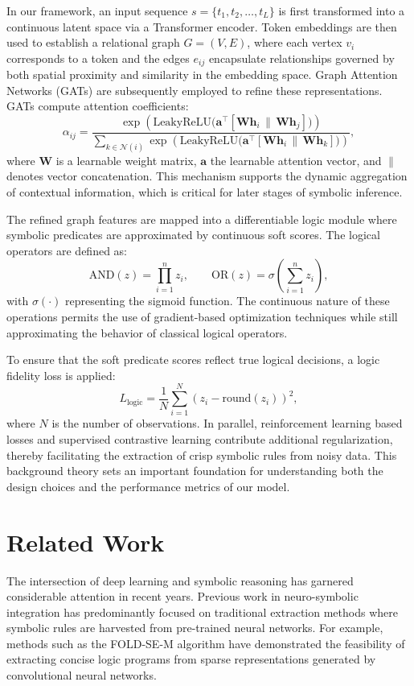 \documentclass{article}
\begin{document}
In our framework, an input sequence \(s=\{t_1,t_2,\dots,t_L\}\) is first transformed into a continuous latent space via a Transformer encoder. Token embeddings are then used to establish a relational graph \(G=(V,E)\), where each vertex \(v_i\) corresponds to a token and the edges \(e_{ij}\) encapsulate relationships governed by both spatial proximity and similarity in the embedding space. Graph Attention Networks (GATs) are subsequently employed to refine these representations. GATs compute attention coefficients:
\[
\alpha_{ij}=\frac{\exp\left(\text{LeakyReLU}\bigl(\mathbf{a}^{\top}[\mathbf{W}\mathbf{h}_{i}\,\|\,\mathbf{W}\mathbf{h}_{j}]\bigr)\right)}{\sum_{k\in\mathcal{N}(i)}\exp\left(\text{LeakyReLU}\bigl(\mathbf{a}^{\top}[\mathbf{W}\mathbf{h}_{i}\,\|\,\mathbf{W}\mathbf{h}_{k}]\bigr)\right)},
\]
where \(\mathbf{W}\) is a learnable weight matrix, \(\mathbf{a}\) the learnable attention vector, and \(\|\) denotes vector concatenation. This mechanism supports the dynamic aggregation of contextual information, which is critical for later stages of symbolic inference.

The refined graph features are mapped into a differentiable logic module where symbolic predicates are approximated by continuous soft scores. The logical operators are defined as:
\[
\text{AND}(z)=\prod_{i=1}^{n}z_i,\qquad \text{OR}(z)=\sigma\left(\sum_{i=1}^{n}z_i\right),
\]
with \(\sigma(\cdot)\) representing the sigmoid function. The continuous nature of these operations permits the use of gradient-based optimization techniques while still approximating the behavior of classical logical operators.

To ensure that the soft predicate scores reflect true logical decisions, a logic fidelity loss is applied:
\[
L_{\text{logic}}=\frac{1}{N}\sum_{i=1}^{N}(z_i-\text{round}(z_i))^2,
\]
where \(N\) is the number of observations. In parallel, reinforcement learning based losses and supervised contrastive learning contribute additional regularization, thereby facilitating the extraction of crisp symbolic rules from noisy data. This background theory sets an important foundation for understanding both the design choices and the performance metrics of our model.

\section{Related Work}
The intersection of deep learning and symbolic reasoning has garnered considerable attention in recent years. Previous work in neuro-symbolic integration has predominantly focused on traditional extraction methods where symbolic rules are harvested from pre-trained neural networks. For example, methods such as the FOLD-SE-M algorithm have demonstrated the feasibility of extracting concise logic programs from sparse representations generated by convolutional neural networks. 
\end{document}
